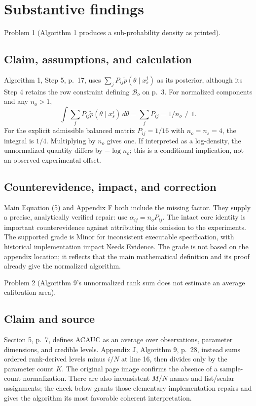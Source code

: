\documentclass[10pt]{article}
\begin{document}
\section*{Substantive findings}
Problem 1 (Algorithm 1 produces a sub-probability density as printed).\par
\subsection*{Claim, assumptions, and calculation}
Algorithm 1, Step 5, p. 17, uses \(\sum_jP_{ij}\widetilde p(\theta\mid x_s^j)\) as its posterior, although its Step 4 retains the row constraint defining \(\mathcal B_o\) on p. 3. For normalized components and any \(n_o>1\), \[\int\sum_jP_{ij}\widetilde p(\theta\mid x_s^j)\,d\theta
=\sum_jP_{ij}=1/n_o\ne1.\] For the explicit admissible balanced matrix \(P_{ij}=1/16\) with \(n_o=n_s=4\), the integral is \(1/4\). Multiplying by \(n_o\) gives one. If interpreted as a log-density, the unnormalized quantity differs by \(-\log n_o\); this is a conditional implication, not an observed experimental offset.\par
\subsection*{Counterevidence, impact, and correction}
Main Equation (5) and Appendix F both include the missing factor. They supply a precise, analytically verified repair: use \(\alpha_{ij}=n_oP_{ij}\). The intact core identity is important counterevidence against attributing this omission to the experiments. The supported grade is Minor for inconsistent executable specification, with historical implementation impact Needs Evidence. The grade is not based on the appendix location; it reflects that the main mathematical definition and its proof already give the normalized algorithm.\par
Problem 2 (Algorithm 9’s unnormalized rank sum does not estimate an average calibration area).\par
\subsection*{Claim and source}
Section 5, p. 7, defines ACAUC as an average over observations, parameter dimensions, and credible levels. Appendix J, Algorithm 9, p. 28, instead sums ordered rank-derived levels minus \(i/N\) at line 16, then divides only by the parameter count \(K\). The original page image confirms the absence of a sample-count normalization. There are also inconsistent \(M/N\) names and list/scalar assignments; the check below grants those elementary implementation repairs and gives the algorithm its most favorable coherent interpretation.\par
\end{document}

